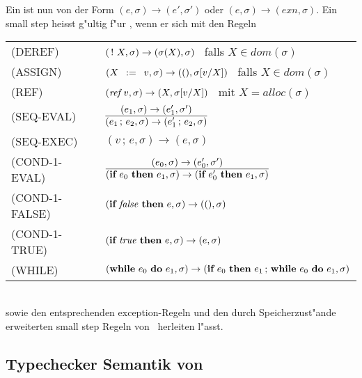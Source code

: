 Ein  ist nun von der Form $(e,\sigma) \to (e',\sigma')$ oder $(e,\sigma) \to (exn,\sigma)$. Ein small
step heisst g"ultig f"ur \LFOUR, wenn er sich mit den Regeln\\[5mm]
  \begin{tabular}{ll}
    \mbox{(DEREF)}        & $(\,!\,\,X, \sigma) \to (\sigma(X), \sigma)$   \ falls $X \in dom(\sigma)$ \\[3mm]
    \mbox{(ASSIGN)}       & $(X\,\ :=\ \,v, \sigma) \to ((), \sigma[v/X])$ \ falls $X \in dom(\sigma)$ \\[3mm]
    \mbox{(REF)}          & $({\text{\it ref\/}}\,v, \sigma) \to (X, \sigma[v/X])$        \ mit $X = alloc(\sigma)$ \\[3mm]
    \mbox{(SEQ-EVAL)}     & $\regel{(e_1,\sigma) \to (e_1',\sigma')}
                                   {(e_1\,;\,e_2,\sigma) \to (e_1'\,;\,e_2,\sigma)}$ \\[5mm]
    \mbox{(SEQ-EXEC)}     & $(v\,;\,e,\sigma) \to (e,\sigma)$ \\[3mm]
    \mbox{(COND-1-EVAL)}  & $\regel{(e_0,\sigma) \to (e_0',\sigma')}
                                   {(\bift{e_0}{e_1},\sigma) \to (\bift{e_0'}{e_1},\sigma)}$ \\[5mm]
    \mbox{(COND-1-FALSE)} & $(\textbf{if}\ {\text{\it false\/}}\ \textbf{then}\ e,\sigma) \to ((),\sigma)$ \\[3mm]
    \mbox{(COND-1-TRUE)}  & $(\textbf{if}\ {\text{\it true\/}}\ \textbf{then}\ e,\sigma) \to (e,\sigma)$ \\[3mm]
    \mbox{(WHILE)}        & $(\textbf{while}\ e_0\ \textbf{do}\ e_1,\sigma) \to (\textbf{if}\ e_0\ \textbf{then}\ e_1\,;\,\textbf{while}\ e_0\ \textbf{do}\ e_1, \sigma)$
  \end{tabular}\\[7mm]
sowie den entsprechenden exception-Regeln und den durch Speicherzust"ande erweiterten small step Regeln von \LTHREE\ 
herleiten l"asst.


\subsection{Typechecker Semantik von \LFOUR}

